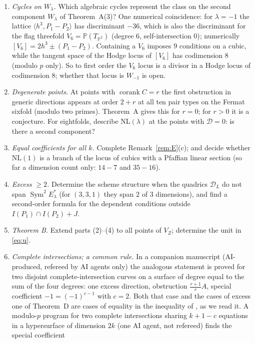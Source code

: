 \documentclass[10pt]{article}
\numberwithin{equation}{section}
\theoremstyle{remark}
\newcommand{\PP}{\mathbb{P}}
\newcommand{\NL}{\mathrm{NL}}
\newcommand{\VZ}{V_Z}
\newcommand{\cD}{\mathcal{D}}
\begin{document}
\begin{enumerate}[label=\textup{\arabic*.}]
\item \emph{Cycles on $W_\lambda$.} Which algebraic cycles represent the class on the second component
$W_\lambda$ of Theorem~A(3)? One numerical coincidence: for $\lambda=-1$ the lattice $\langle h^3,P_1-P_2\rangle$
has discriminant $-36$, which is also the discriminant for the flag threefold $V_6=\PP(T_{\PP^2})$ (degree $6$,
self-intersection $0$); numerically $[V_6]=2h^3\pm(P_1-P_2)$. Containing a $V_6$ imposes $9$ conditions on a
cubic, while the tangent space of the Hodge locus of $[V_6]$ has codimension $8$ (modulo $p$ only). So to first
order the $V_6$ locus is a divisor in a Hodge locus of codimension $8$; whether that locus is $W_{-1}$ is open.
\item \emph{Degenerate points.} At points with $\operatorname{corank}C=r$ the first obstruction in generic
directions appears at order $2+r$ at all ten pair types on the Fermat sixfold (modulo two primes). Theorem~A
gives this for $r=0$; for $r>0$ it is a conjecture. For eightfolds, describe $\NL(\lambda)$ at the points with
$\cD=0$: is there a second component?
\item \emph{Equal coefficients for all $k$.} Complete Remark~\ref{rem:E}(c); and decide whether $\NL(1)$ is a
branch of the locus of cubics with a Pfaffian linear section (so far a dimension count only: $14-7$ and
$35-16$).
\item \emph{Excess $\ge2$.} Determine the scheme structure when the quadrics $\cD_L$ do not span
$\operatorname{Sym}^2E_\lambda^*$ (for $(3,3,1)$ they span $2$ of $3$ dimensions), and find a second-order
formula for the dependent conditions outside $I(P_1)\cap I(P_2)+J$.
\item \emph{Theorem B.} Extend parts (2)--(4) to all points of $\VZ$; determine the unit in \eqref{eq:u}.
\item \emph{Complete intersections; a common rule.} In a companion manuscript \cite{P2} (AI-produced, refereed by AI
agents only) the analogous statement is proved for two disjoint complete-intersection curves on a surface of degree
equal to the sum of the four degrees: one excess direction, obstruction $\tfrac{r+1}{r}A$, special coefficient
$-1=(-1)^{c-1}$ with $c=2$. Both that case and the cases of excess one of Theorem~D are cases of equality in the
inequality of \cite[Thm~1.5]{Kl1}, as we read it. A modulo-$p$ program for two complete intersections sharing
$k+1-c$ equations in a hypersurface of dimension $2k$ (one AI agent, not refereed) finds the special coefficient

\end{enumerate}
\end{document}

